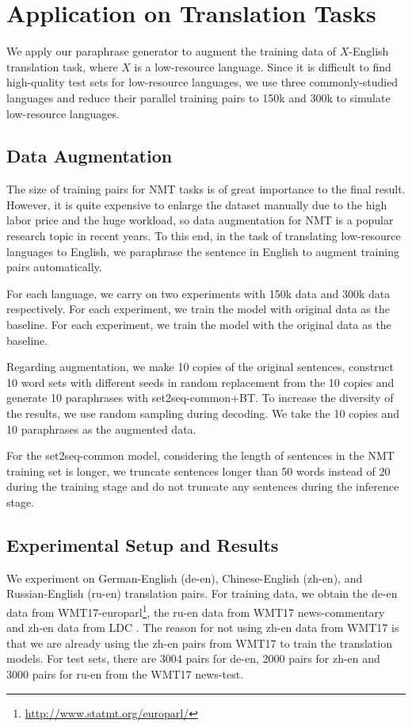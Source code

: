 \section{Application on Translation Tasks} \label{sec:app}
We apply our paraphrase generator to augment the training data of $X$-English 
translation task, where $X$ is a low-resource language. 
Since it is difficult to find high-quality test sets for low-resource 
languages, we use three commonly-studied languages and reduce their 
parallel training pairs to 150k and 300k to simulate low-resource languages. 

\subsection{Data Augmentation}
The size of training pairs for NMT tasks is of great importance to the final result. However, it is quite expensive to enlarge the dataset manually due to the high labor price and the huge workload, so data augmentation for NMT is a popular research topic in recent years. To this end, in the task of translating low-resource languages to English, we paraphrase the sentence in English to augment training pairs automatically.

For each language, we carry on two experiments with 150k data and 300k data respectively. For each experiment, we train the model with original data 
as the baseline. 
For each experiment, we train the model with the original
data as the baseline.

Regarding augmentation, we make 10 copies of the original sentences, 
construct 10 word sets with different seeds in random replacement from the 10 copies and generate 10 paraphrases 
with set2seq-common+BT.
To increase the diversity of the results, 
we use random sampling \citep{edunov2018understanding} during decoding. 
We take the 10 copies and 10 paraphrases as the augmented data.

For the set2seq-common model, considering the length of sentences 
in the NMT training set is longer, we truncate sentences longer 
than 50 words instead of 20 during the training stage and 
do not truncate any sentences during the inference stage.

\subsection{Experimental Setup and Results}
We experiment on German-English (de-en), Chinese-English (zh-en), and Russian-English (ru-en) translation pairs. For training data, we obtain the de-en data from WMT17-europarl\footnote{\url{http://www.statmt.org/europarl/}}\citep{koehn2005europarl}, the ru-en data from WMT17 news-commentary and zh-en data from LDC \citep{liberman2002emotional,huang2002multiple}. The reason for not using zh-en data from WMT17 is that we are already using the zh-en pairs from WMT17 to train 
the translation models.
For test sets, there are 3004 pairs for de-en, 2000 pairs for zh-en and 
3000 pairs for ru-en from the WMT17 news-test.

